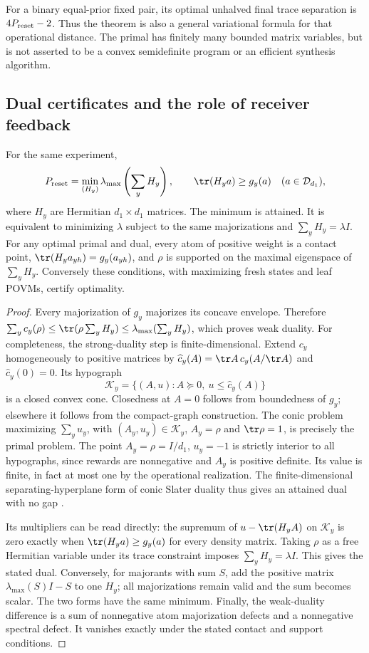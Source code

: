 For a binary equal-prior fixed pair, its optimal unhalved final trace
separation is $4P_{\rm reset}-2$.  Thus the theorem is also a general
variational formula for that operational distance.  The primal has
finitely many bounded matrix variables, but is not asserted to be a
convex semidefinite program or an efficient synthesis algorithm.

\subsection{Dual certificates and the role of receiver feedback}
\begin{theorem}\label{thm:resetdual91}
For the same experiment,
\begin{equation}\label{eq:resetdual91}
 P_{\rm reset}=\min_{(H_y)}\lambda_{\max}\left(\sum_yH_y\right),
 \qquad \tr(H_ya)\ge g_y(a)\quad(a\in\mathcal D_{d_1}),
\end{equation}
where $H_y$ are Hermitian $d_1\times d_1$ matrices.  The minimum is
attained.  It is equivalent to minimizing $\lambda$ subject to the
same majorizations and $\sum_yH_y=\lambda I$.
For any optimal primal and dual, every atom of positive weight is a
contact point, $\tr(H_ya_{yh})=g_y(a_{yh})$, and $\rho$ is supported
on the maximal eigenspace of $\sum_yH_y$.  Conversely these conditions,
with maximizing fresh states and leaf POVMs, certify optimality.
\end{theorem}
\begin{proof}
Every majorization of $g_y$ majorizes its concave envelope.  Therefore
$\sum_yc_y(\rho)\le\tr(\rho\sum_yH_y)\le
\lambda_{\max}(\sum_yH_y)$, which proves weak duality.
For completeness, the strong-duality step is finite-dimensional.
Extend $c_y$ homogeneously to positive matrices by
$\widehat c_y(A)=\tr A\,c_y(A/\tr A)$ and $\widehat c_y(0)=0$.
Its hypograph
\[
 \mathcal K_y=\{(A,u):A\succeq0,\ u\le\widehat c_y(A)\}
\]
is a closed convex cone.  Closedness at $A=0$ follows from boundedness
of $g_y$; elsewhere it follows from the compact-graph construction.
The conic problem maximizing $\sum_yu_y$, with $(A_y,u_y)\in\mathcal K_y$,
$A_y=\rho$ and $\tr\rho=1$, is precisely the primal problem.
The point $A_y=\rho=I/d_1$, $u_y=-1$ is strictly interior to all
hypographs, since rewards are nonnegative and $A_y$ is positive definite.
Its value is finite, in fact at most one by the operational realization.
The finite-dimensional separating-hyperplane form of conic Slater
duality thus gives an attained dual with no gap
\cite[Section~5.2.3]{BV91}.

Its multipliers can be read directly: the supremum of
$u-\tr(H_yA)$ on $\mathcal K_y$ is zero exactly when
$\tr(H_ya)\ge g_y(a)$ for every density matrix.  Taking $\rho$ as a
free Hermitian variable under its trace constraint imposes
$\sum_yH_y=\lambda I$.  This gives the stated dual.  Conversely, for
majorants with sum $S$, add the positive matrix
$\lambda_{\max}(S)I-S$ to one $H_y$; all majorizations remain valid
and the sum becomes scalar.  The two forms have the same minimum.
Finally, the weak-duality difference is a sum of nonnegative atom
majorization defects and a nonnegative spectral defect.  It vanishes
exactly under the stated contact and support conditions.
\end{proof}
